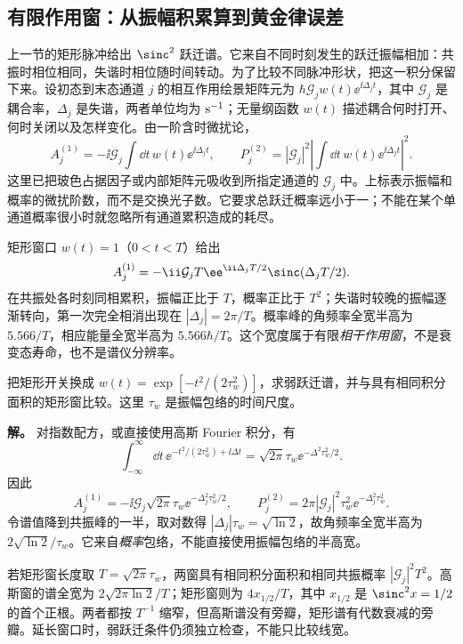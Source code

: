 \subsection{有限作用窗：从振幅积累算到黄金律误差}
\label{sec:electron-finite-window-worked}

上一节的矩形脉冲给出 $\sinc^2$ 跃迁谱。它来自不同时刻发生的跃迁振幅相加：共振时相位相同，失谐时相位随时间转动。为了比较不同脉冲形状，把这一积分保留下来。设初态到末态通道 $j$ 的相互作用绘景矩阵元为 $\hbar\mathcal G_jw(t)\ee^{\ii\Delta_jt}$，其中 $\mathcal G_j$ 是耦合率，$\Delta_j$ 是失谐，两者单位均为 ${\rm s^{-1}}$；无量纲函数 $w(t)$ 描述耦合何时打开、何时关闭以及怎样变化。由一阶含时微扰论，
\begin{equation}
 A_j^{(1)}=-\ii\mathcal G_j\int\dd t\,w(t)\ee^{\ii\Delta_jt},\qquad
 P_j^{(2)}=|\mathcal G_j|^2\left|\int\dd t\,w(t)\ee^{\ii\Delta_jt}\right|^2.
 \label{eq:electron-window-general-amplitude}
\end{equation}
这里已把玻色占据因子或内部矩阵元吸收到所指定通道的 $\mathcal G_j$ 中。上标表示振幅和概率的微扰阶数，而不是交换光子数。它要求总跃迁概率远小于一；不能在某个单通道概率很小时就忽略所有通道累积造成的耗尽。

矩形窗口 $w(t)=1$（$0<t<T$）给出
\begin{equation*}
 A_j^{(1)}=-\ii\mathcal G_jT\ee^{\ii\Delta_jT/2}
 \sinc(\Delta_jT/2).
\end{equation*}
在共振处各时刻同相累积，振幅正比于 $T$，概率正比于 $T^2$；失谐时较晚的振幅逐渐转向，第一次完全相消出现在 $|\Delta_j|=2\pi/T$。概率峰的角频率全宽半高为 $5.566/T$，相应能量全宽半高为 $5.566\hbar/T$。这个宽度属于有限\emph{相干作用窗}，不是衰变态寿命，也不是谱仪分辨率。

\begin{exbox}[高斯作用窗的线宽与等面积比较]
把矩形开关换成 $w(t)=\exp[-t^2/(2\tau_w^2)]$，求弱跃迁谱，并与具有相同积分面积的矩形窗比较。这里 $\tau_w$ 是振幅包络的时间尺度。

\textbf{解。} 对指数配方，或直接使用高斯 Fourier 积分，有
\begin{equation*}
 \int_{-\infty}^{\infty}\dd t\,
 \ee^{-t^2/(2\tau_w^2)+\ii\Delta t}
 =\sqrt{2\pi}\tau_w\ee^{-\Delta^2\tau_w^2/2}.
\end{equation*}
因此
\begin{equation*}
 A_j^{(1)}=-\ii\mathcal G_j\sqrt{2\pi}\tau_w
 \ee^{-\Delta_j^2\tau_w^2/2},\qquad
 P_j^{(2)}=2\pi|\mathcal G_j|^2\tau_w^2
 \ee^{-\Delta_j^2\tau_w^2}.
\end{equation*}
令谱值降到共振峰的一半，取对数得 $|\Delta_j|\tau_w=\sqrt{\ln2}$，故角频率全宽半高为 $2\sqrt{\ln2}/\tau_w$。它来自\emph{概率}包络，不能直接使用振幅包络的半高宽。

若矩形窗长度取 $T=\sqrt{2\pi}\tau_w$，两窗具有相同积分面积和相同共振概率 $|\mathcal G_j|^2T^2$。高斯窗的谱全宽为 $2\sqrt{2\pi\ln2}/T$；矩形窗则为 $4x_{1/2}/T$，其中 $x_{1/2}$ 是 $\sinc^2x=1/2$ 的首个正根。两者都按 $T^{-1}$ 缩窄，但高斯谱没有旁瓣，矩形谱有代数衰减的旁瓣。延长窗口时，弱跃迁条件仍须独立检查，不能只比较线宽。
\end{exbox}

